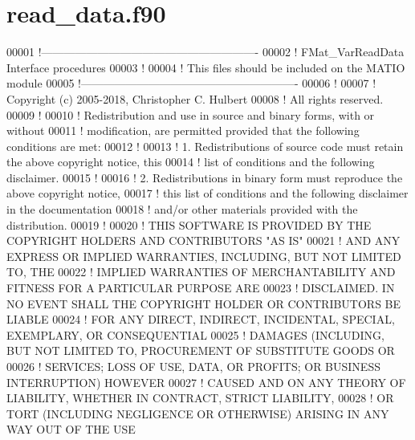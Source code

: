 \hypertarget{read__data_8f90_source}{}\section{read\+\_\+data.\+f90}
\label{read__data_8f90_source}

\begin{DoxyCode}
00001 \textcolor{comment}{!----------------------------------------------------------}
00002 \textcolor{comment}{!   FMat\_VarReadData Interface procedures}
00003 \textcolor{comment}{!}
00004 \textcolor{comment}{!   This files should be included on the MATIO module}
00005 \textcolor{comment}{!----------------------------------------------------------}
00006 \textcolor{comment}{!}
00007 \textcolor{comment}{! Copyright (c) 2005-2018, Christopher C. Hulbert}
00008 \textcolor{comment}{! All rights reserved.}
00009 \textcolor{comment}{!}
00010 \textcolor{comment}{! Redistribution and use in source and binary forms, with or without}
00011 \textcolor{comment}{! modification, are permitted provided that the following conditions are met:}
00012 \textcolor{comment}{!}
00013 \textcolor{comment}{! 1. Redistributions of source code must retain the above copyright notice, this}
00014 \textcolor{comment}{!    list of conditions and the following disclaimer.}
00015 \textcolor{comment}{!}
00016 \textcolor{comment}{! 2. Redistributions in binary form must reproduce the above copyright notice,}
00017 \textcolor{comment}{!    this list of conditions and the following disclaimer in the documentation}
00018 \textcolor{comment}{!    and/or other materials provided with the distribution.}
00019 \textcolor{comment}{!}
00020 \textcolor{comment}{! THIS SOFTWARE IS PROVIDED BY THE COPYRIGHT HOLDERS AND CONTRIBUTORS "AS IS"}
00021 \textcolor{comment}{! AND ANY EXPRESS OR IMPLIED WARRANTIES, INCLUDING, BUT NOT LIMITED TO, THE}
00022 \textcolor{comment}{! IMPLIED WARRANTIES OF MERCHANTABILITY AND FITNESS FOR A PARTICULAR PURPOSE ARE}
00023 \textcolor{comment}{! DISCLAIMED. IN NO EVENT SHALL THE COPYRIGHT HOLDER OR CONTRIBUTORS BE LIABLE}
00024 \textcolor{comment}{! FOR ANY DIRECT, INDIRECT, INCIDENTAL, SPECIAL, EXEMPLARY, OR CONSEQUENTIAL}
00025 \textcolor{comment}{! DAMAGES (INCLUDING, BUT NOT LIMITED TO, PROCUREMENT OF SUBSTITUTE GOODS OR}
00026 \textcolor{comment}{! SERVICES; LOSS OF USE, DATA, OR PROFITS; OR BUSINESS INTERRUPTION) HOWEVER}
00027 \textcolor{comment}{! CAUSED AND ON ANY THEORY OF LIABILITY, WHETHER IN CONTRACT, STRICT LIABILITY,}
00028 \textcolor{comment}{! OR TORT (INCLUDING NEGLIGENCE OR OTHERWISE) ARISING IN ANY WAY OUT OF THE USE}

\end{DoxyCode}
